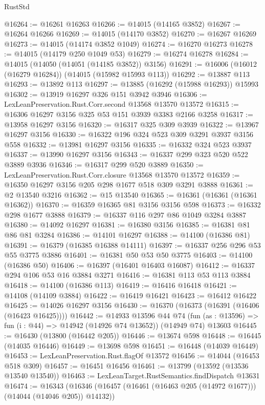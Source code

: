 \begin{lexlean}{RustStd}
\begin{coremodule}
@16264 := @16261 @16263
@16266 := @14015 (@14165 @3852)
@16267 := @16264 @16266
@16269 := @14015 (@14170 @3852)
@16270 := @16267 @16269
@16273 := @14015 (@14174 @3852 @1049)
@16274 := @16270 @16273
@16278 := @14015 (@14179 @250 @1049 @53)
@16279 := @16274 @16278
@16284 := @14015 (@14050 (@14051 (@14185 @3852)) @3156)
@16291 := @16006 (@16012 (@16279 @16284)) (@14015 (@15982 @15993 @113))
@16292 := @13887 @113
@16293 := @13892 @113
@16297 := @13885 (@16292 (@15988 @16293)) @15993
@16302 := @13919 @16297 @326 @151 @3942 @3946
@16306 := LexLeanPreservation.Rust.Corr.second @13568 @13570 @13572
@16315 := @16306 @16297 @3156 @325 @53 @151 @3939 @3383 @2166 @3258
@16317 := @13958 @16297 @3156
@16320 := @16317 @325 @309 @3939
@16322 := @13967 @16297 @3156
@16330 := @16322 @196 @324 @523 @309 @3291 @3937 @3156 @558
@16332 := @13981 @16297 @3156
@16335 := @16332 @324 @523 @3937
@16337 := @13990 @16297 @3156
@16343 := @16337 @299 @323 @520 @522 @3889 @3936
@16346 := @16317 @299 @520 @3889
@16350 := LexLeanPreservation.Rust.Corr.closure @13568 @13570 @13572
@16359 := @16350 @16297 @3156 @205 @298 @1677 @518 @309 @3291 @3888
@16361 := @2 @13540 @3216
@16362 := @15 @13540
@16365 := @16361 (@16361 (@16361 @16362))
@16370 := @16359 @16365 @81 @3156 @3156 @598
@16373 := @16332 @298 @1677 @3888
@16379 := @16337 @116 @297 @86 @1049 @3284 @3887
@16380 := @14092 @16297
@16381 := @16380 @3156
@16385 := @16381 @81 @86 @81 @3284
@16386 := @14101 @16297
@16388 := @14100 (@16386 @81)
@16391 := @16379 (@16385 @16388 @14111)
@16397 := @16337 @256 @296 @53 @55 @3775 @3886
@16401 := @16381 @50 @53 @50 @3775
@16403 := @14100 (@16386 @50)
@16406 := @16397 (@16401 @16403 @16087)
@16412 := @16337 @294 @106 @53 @16 @3884 @3271
@16416 := @16381 @113 @53 @113 @3884
@16418 := @14100 (@16386 @113)
@16419 := @16416 @16418
@16421 := @14108 (@14109 @3884)
@16422 := @16419 @16421
@16423 := @16412 @16422
@16425 := @14026 @16297 @3156
@16430 := @16370 (@16373 (@16391 (@16406 (@16423 @16425))))
@16442 := @14933
    @13596
    @44
    @74
    (fun (as : @13596) => fun (i : @44) => @14942 (@14926 @74 @13652))
    (@14949 @74)
    @13603
@16445 := @16430 (@13800 (@16442 @205))
@16446 := @13674 @598
@16448 := @16445 (@14035 @16446)
@16449 := @13698 @598
@16451 := @16448 (@14039 @16449)
@16453 := LexLeanPreservation.Rust.flagOf @13572
@16456 := @14044 (@16453 @518 @309)
@16457 := @16451 @16456
@16461 := @13799 (@13592 (@13536 @13540 @13540))
@16463 := LexLeanTarget.RustSemantics.findDispatch @13631
@16474 := @16343
    (@16346 (@16457 (@16461 (@16463 @205 (@14972 @1677))) (@14044 (@14046 @205)) @14132))

\end{coremodule}
\end{lexlean}
